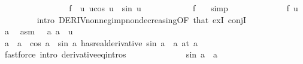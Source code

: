 \begin{isabellebody}
\ \ \ \ \ \ \isamarkupfalse%
{\isacharminus}{\kern0pt}\isanewline
\ \ \ \ \ \ \ \ \isamarkupfalse%
\ {\isacharquery}{\kern0pt}f\ {\isacharequal}{\kern0pt}\ {\isachardoublequoteopen}{\isasymlambda}u{\isachardot}{\kern0pt}\ {\isacharminus}{\kern0pt}u{\isacharasterisk}{\kern0pt}cos\ u\ {\isacharplus}{\kern0pt}\ sin\ u{\isachardoublequoteclose}\isanewline
\ \ \ \ \ \ \ \ \isamarkupfalse%
\ {\isachardoublequoteopen}{}\ {\isacharequal}{\kern0pt}\ {\isacharquery}{\kern0pt}f\ {}{\isachardoublequoteclose}\ \isamarkupfalse%
\ simp\isanewline
\ \ \ \ \ \ \ \ \isamarkupfalse%
\ \isamarkupfalse%
\ {\isachardoublequoteopen}{\isasymdots}\ {\isasymle}\ {\isacharquery}{\kern0pt}f\ u{\isachardoublequoteclose}\isanewline
\ \ \ \ \ \ \ \ \isamarkupfalse%
{\isacharparenleft}{\kern0pt}intro\ DERIV{\isacharunderscore}{\kern0pt}nonneg{\isacharunderscore}{\kern0pt}imp{\isacharunderscore}{\kern0pt}nondecreasing{\isacharbrackleft}{\kern0pt}OF\ that{\isacharparenleft}{\kern0pt}{}{\isacharparenright}{\kern0pt}{\isacharbrackright}{\kern0pt}\ exI\ conjI{\isacharparenright}{\kern0pt}\isanewline
\ \ \ \ \ \ \ \ \ \ \isamarkupfalse%
\ a\ \isamarkupfalse%
\ asm{\isacharcolon}{\kern0pt}\ {\isacartoucheopen}{}\ {\isasymle}\ a{\isacartoucheclose}\ {\isachardoublequoteopen}a\ {\isasymle}\ u{\isachardoublequoteclose}\isanewline
\ \ \ \ \ \ \ \ \ \ \isamarkupfalse%
\ {\isachardoublequoteopen}{\isacharparenleft}{\kern0pt}{\isacharparenleft}{\kern0pt}{\isasymlambda}a{\isachardot}{\kern0pt}\ {\isacharminus}{\kern0pt}\ a\ {\isacharasterisk}{\kern0pt}\ cos\ a\ {\isacharplus}{\kern0pt}\ sin\ a{\isacharparenright}{\kern0pt}\ has{\isacharunderscore}{\kern0pt}real{\isacharunderscore}{\kern0pt}derivative\ sin\ a\ {\isacharasterisk}{\kern0pt}\ a{\isacharparenright}{\kern0pt}\ {\isacharparenleft}{\kern0pt}at\ a{\isacharparenright}{\kern0pt}{\isachardoublequoteclose}\isanewline
\ \ \ \ \ \ \ \ \ \ \ \ \isamarkupfalse%
\ {\isacharparenleft}{\kern0pt}fastforce\ intro{\isacharcolon}{\kern0pt}\ derivative{\isacharunderscore}{\kern0pt}eq{\isacharunderscore}{\kern0pt}intros{\isacharparenright}{\kern0pt}\isanewline
\ \ \ \ \ \ \ \ \ \ \isamarkupfalse%
\ {\isachardoublequoteopen}{}\ {\isasymle}\ sin\ a\ {\isacharasterisk}{\kern0pt}\ a{\isachardoublequoteclose}\isanewline
\ \ \ \ \ \ \ \ \ \ \isamarkupfalse%

\end{isabellebody}
